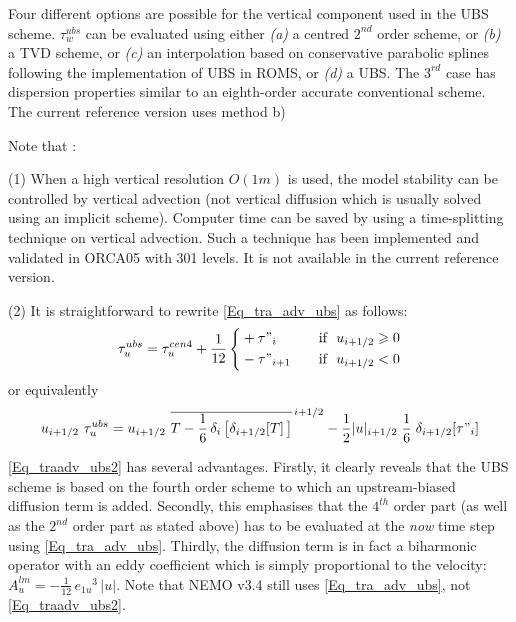 Four different options are possible for the vertical 
component used in the UBS scheme. $\tau _w^{ubs}$ can be evaluated 
using either \textit{(a)} a centred $2^{nd}$ order scheme, or  \textit{(b)} 
a TVD scheme, or  \textit{(c)} an interpolation based on conservative 
parabolic splines following the \citet{Shchepetkin_McWilliams_OM05} 
implementation of UBS in ROMS, or  \textit{(d)} a UBS. The $3^{rd}$ case 
has dispersion properties similar to an eighth-order accurate conventional scheme.
The current reference version uses method b)

Note that :

(1) When a high vertical resolution $O(1m)$ is used, the model stability can 
be controlled by vertical advection (not vertical diffusion which is usually 
solved using an implicit scheme). Computer time can be saved by using a 
time-splitting technique on vertical advection. Such a technique has been 
implemented and validated in ORCA05 with 301 levels. It is not available 
in the current reference version. 

(2) It is straightforward to rewrite \eqref{Eq_tra_adv_ubs} as follows:
\begin{equation} \label{Eq_traadv_ubs2}
\tau _u^{ubs} = \tau _u^{cen4} + \frac{1}{12} \left\{	 
   \begin{aligned}
	& + \tau"_i			& \quad \text{if }\ u_{i+1/2} \geqslant 0 \\
	&  - \tau"_{i+1}		& \quad \text{if }\ u_{i+1/2}       <       0
   \end{aligned}    \right.
\end{equation}
or equivalently 
\begin{equation} \label{Eq_traadv_ubs2b}
u_{i+1/2} \ \tau _u^{ubs} 
=u_{i+1/2} \ \overline{ T - \frac{1}{6}\,\delta _i\left[ \delta_{i+1/2}[T] \,\right] }^{\,i+1/2}
- \frac{1}{2} |u|_{i+1/2} \;\frac{1}{6} \;\delta_{i+1/2}[\tau"_i]
\end{equation}

\eqref{Eq_traadv_ubs2} has several advantages. Firstly, it clearly reveals 
that the UBS scheme is based on the fourth order scheme to which an 
upstream-biased diffusion term is added. Secondly, this emphasises that the 
$4^{th}$ order part (as well as the $2^{nd}$ order part as stated above) has 
to be evaluated at the \emph{now} time step using \eqref{Eq_tra_adv_ubs}. 
Thirdly, the diffusion term is in fact a biharmonic operator with an eddy 
coefficient which is simply proportional to the velocity:
 $A_u^{lm}= - \frac{1}{12}\,{e_{1u}}^3\,|u|$. Note that NEMO v3.4 still uses 
 \eqref{Eq_tra_adv_ubs}, not \eqref{Eq_traadv_ubs2}.

